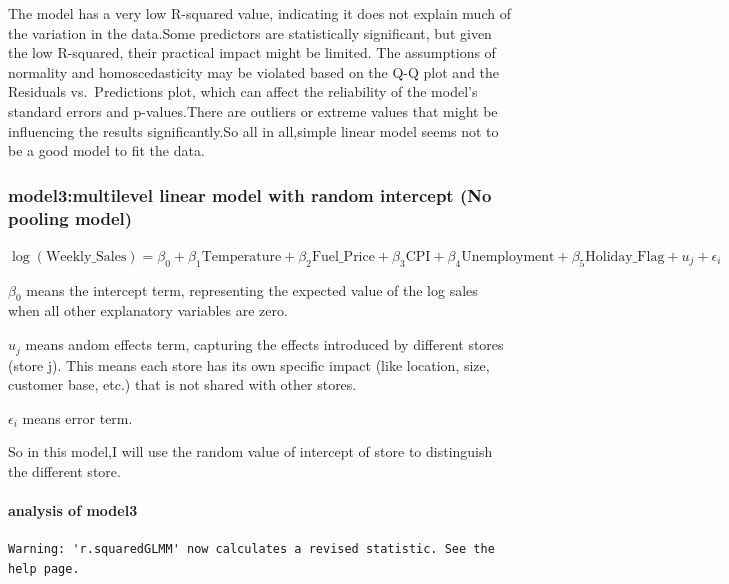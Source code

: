 \documentclass[
  letterpaper,
  DIV=11,
  numbers=noendperiod]{scrartcl}
\let\oldparagraph\paragraph
\renewcommand{\paragraph}[1]{\oldparagraph{#1}\mbox{}}
\begin{document}
The model has a very low R-squared value, indicating it does not explain
much of the variation in the data.Some predictors are statistically
significant, but given the low R-squared, their practical impact might
be limited. The assumptions of normality and homoscedasticity may be
violated based on the Q-Q plot and the Residuals vs.~Predictions plot,
which can affect the reliability of the model's standard errors and
p-values.There are outliers or extreme values that might be influencing
the results significantly.So all in all,simple linear model seems not to
be a good model to fit the data.

\hypertarget{model3multilevel-linear-model-with-random-intercept-no-pooling-model}{%
\subsubsection{model3:multilevel linear model with random intercept (No
pooling
model)}\label{model3multilevel-linear-model-with-random-intercept-no-pooling-model}}

\(\log(\text{Weekly_Sales}) = \beta_0 + \beta_1 \text{Temperature} + \beta_2 \text{Fuel_Price} + \beta_3 \text{CPI} + \beta_4 \text{Unemployment} + \beta_5 \text{Holiday_Flag} + u_j + \epsilon_i\)

\(\beta_0\) means the intercept term, representing the expected value of
the log sales when all other explanatory variables are zero.

\(u_j\) means andom effects term, capturing the effects introduced by
different stores (store j). This means each store has its own specific
impact (like location, size, customer base, etc.) that is not shared
with other stores.

\(\epsilon_i\) means error term.

So in this model,I will use the random value of intercept of store to
distinguish the different store.

\hypertarget{analysis-of-model3}{%
\paragraph{analysis of model3}\label{analysis-of-model3}}

\begin{verbatim}
Warning: 'r.squaredGLMM' now calculates a revised statistic. See the help page.
\end{verbatim}
\end{document}
